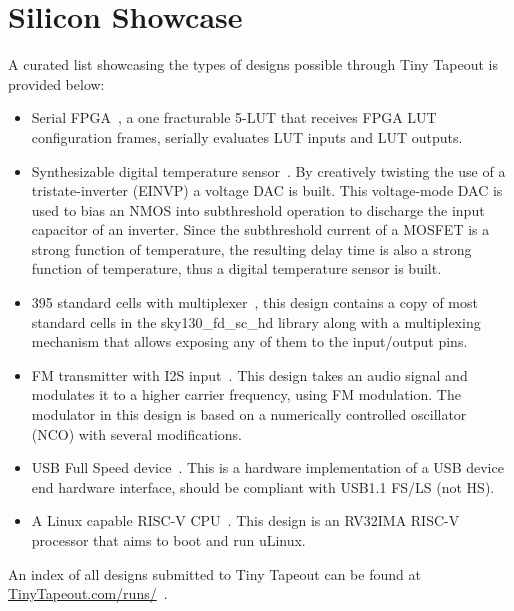 \section{Silicon Showcase}
\label{sec:silicon_showcase}

A curated list showcasing the types of designs possible through Tiny Tapeout is provided below:

\begin{itemize}
    \item Serial FPGA~\cite{showcaseserialfpga}, a one fracturable 5-LUT that receives FPGA LUT configuration frames, serially evaluates LUT inputs and LUT outputs.
    \item Synthesizable digital temperature sensor~\cite{showcasetempsense}. By creatively twisting the use of a tristate-inverter (EINVP) a voltage DAC is built. This voltage-mode DAC is used to bias an NMOS into subthreshold operation to discharge the input capacitor of an inverter. Since the subthreshold current of a MOSFET is a strong function of temperature, the resulting delay time is also a strong function of temperature, thus a digital temperature sensor is built.
    \item 395 standard cells with multiplexer~\cite{showcasemicrotapeout}, this design contains a copy of most standard cells in the sky130\_fd\_sc\_hd library along with a multiplexing mechanism that allows exposing any of them to the input/output pins.
    \item FM transmitter with I2S input~\cite{showcasefmtx}. This design takes an audio signal and modulates it to a higher carrier frequency, using FM modulation. The modulator in this design is based on a numerically controlled oscillator (NCO) with several modifications.
    \item USB Full Speed device~\cite{showcaseusb}. This is a hardware implementation of a USB device end hardware interface, should be compliant with USB1.1 FS/LS (not HS).
    \item A Linux capable RISC-V CPU~\cite{showcasekianv}. This design is an RV32IMA RISC-V processor that aims to boot and run uLinux.
\end{itemize}

An index of all designs submitted to Tiny Tapeout can be found at \url{TinyTapeout.com/runs/}~\cite{tinytapeoutruns}.
